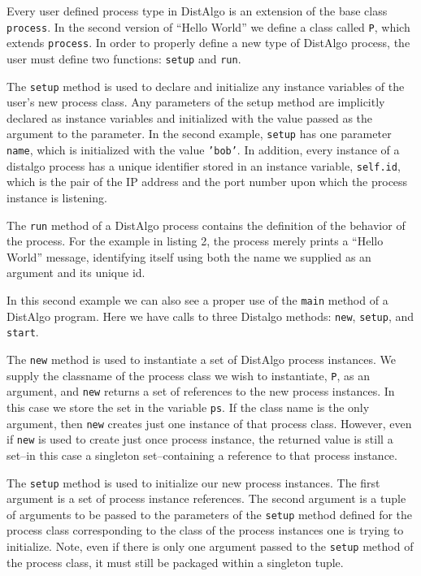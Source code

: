 \documentclass[11pt]{article}
\begin{document}
Every user defined process type in DistAlgo is an extension of the base class
\texttt{process}. In the second version of ``Hello World'' we define a class
called \texttt{P}, which extends \texttt{process}. In order to properly define
a new type of DistAlgo process, the user must define two functions:
\texttt{setup} and \texttt{run}.

The \texttt{setup} method is used to declare and initialize any instance
variables of the user's new process class. Any parameters of the setup method
are implicitly declared as instance variables and initialized with the value
passed as the argument to the parameter. In the second example, \texttt{setup}
has one parameter \texttt{name}, which is initialized with the value
\texttt{'bob'}. In addition, every instance of a distalgo process has a unique
identifier stored in an instance variable, \texttt{self.id}, which is the pair
of the IP address and the port number upon which the process instance is
listening.

The \texttt{run} method of a DistAlgo process contains the definition of the
behavior of the process. For the example in listing 2, the process merely
prints a ``Hello World'' message, identifying itself using both the name we
supplied as an argument and its unique id.

In this second example we can also see a proper use of the \texttt{main} method
of a DistAlgo program. Here we have calls to three Distalgo methods:
\texttt{new}, \texttt{setup}, and \texttt{start}.

The \texttt{new} method is used to instantiate a set of DistAlgo process
instances. We supply the classname of the process class we wish to instantiate,
\texttt{P}, as an argument, and \texttt{new} returns a set of references to the
new process instances. In this case we store the set in the variable
\texttt{ps}.  If the class name is the only argument, then \texttt{new} creates
just one instance of that process class. However, even if \texttt{new} is used
to create just once process instance, the returned value is still a set--in
this case a singleton set--containing a reference to that process instance.

The \texttt{setup} method is used to initialize our new process instances. The
first argument is a set of process instance references. The second argument is
a tuple of arguments to be passed to the parameters of the \texttt{setup}
method defined for the process class corresponding to the class of the process
instances one is trying to initialize. Note, even if there is only one argument
passed to the \texttt{setup} method of the process class, it must still be
packaged within a singleton tuple.
\end{document}
